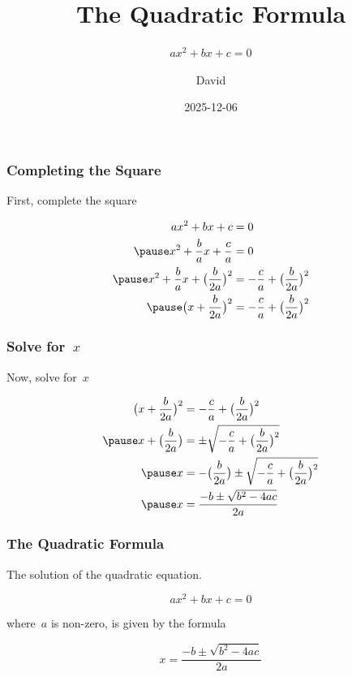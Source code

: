 \documentclass{ltx-talk}
\title{The Quadratic Formula}
\subtitle{$ax^{2} + bx + c = 0$}
\author{David}
\institute{The \LaTeX{} Project}
\date{2025-12-06}
\begin{document}
\addtolength\jot{12pt}
\maketitle


\begin{frame}
  \frametitle{Completing the Square}

  \large

  First, complete the square
  
  \begin{align}
    ax^{2} + bx +c& =0 \\ \pause
    x^{2} + \frac{b}{a}x + \frac{c}{a} & = 0 \\ \pause
    x^{2} + \frac{b}{a}x + \bigl(\frac{b}{2a}\bigr)^{2} 
      & = -\frac{c}{a} + \bigl(\frac{b}{2a}\bigr)^{2} \\ \pause
    \bigl(x + \frac{b}{2a}\bigr)^{2} 
      & = -\frac{c}{a} + \bigl(\frac{b}{2a}\bigr)^{2}
  \end{align}
\end{frame}

\begin{frame}
 \frametitle{Solve for~$x$}
 \large

 Now, solve for~$x$
 
  \begin{align}
    \bigl(x + \frac{b}{2a}\bigr)^{2}
      &= -\frac{c}{a} + \bigl(\frac{b}{2a}\bigr)^{2} \\ \pause
    x + \bigl(\frac{b}{2a}\bigr)
      &= \pm \sqrt{-\frac{c}{a} + \bigl(\frac{b}{2a}\bigr)^{2}} \\ \pause
    x &= -\bigl(\frac{b}{2a}\bigr)
      \pm \sqrt{-\frac{c}{a} + \bigl(\frac{b}{2a}\bigr)^{2}} \\ \pause
     x &= \frac{-b \pm \sqrt{b^{2} - 4ac}}{2a}
  \end{align}
    
\end{frame}

\begin{frame}
 \frametitle{The Quadratic Formula}
 \large

 The solution of the quadratic equation.

 \[
   ax^{2} + bx + c = 0
 \]

 where~$a$ is non-zero, is given by the formula

  \[
    x = \frac{-b \pm \sqrt{b^{2} - 4ac}}{2a}
  \]

\end{frame}
\end{document}
